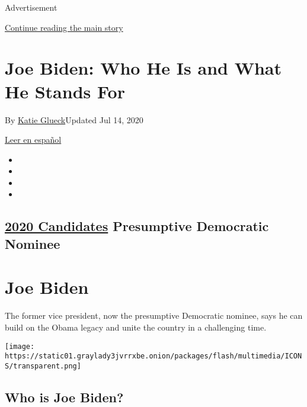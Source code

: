 Advertisement

\protect\hyperlink{after-top}{Continue reading the main story}

\hypertarget{joe-biden-who-he-is-and-what-he-stands-for}{%
\section{Joe Biden: Who He Is and What He Stands
For}\label{joe-biden-who-he-is-and-what-he-stands-for}}

By \href{https://www.nytimes3xbfgragh.onion/by/katie-glueck}{Katie
Glueck}Updated Jul 14, 2020

\href{https://www.nytimes3xbfgragh.onion/es/interactive/2020/espanol/estados-unidos/joe-biden-elecciones.html}{Leer
en español}

\begin{itemize}
\item
\item
\item
\item
\end{itemize}

\hypertarget{2020-candidates--presumptive-democratic-nominee-}{%
\subsection{\texorpdfstring{\href{https://www.nytimes3xbfgragh.onion/interactive/2019/us/politics/2020-presidential-candidates.html}{2020
Candidates} Presumptive Democratic Nominee
}{2020 Candidates  Presumptive Democratic Nominee }}\label{2020-candidates--presumptive-democratic-nominee-}}

\hypertarget{joe-biden}{%
\section{Joe Biden}\label{joe-biden}}

The former vice president, now the presumptive Democratic nominee, says
he can build on the Obama legacy and unite the country in a challenging
time.

\texttt{[image: https://static01.graylady3jvrrxbe.onion/packages/flash/multimedia/ICONS/transparent.png]}

\hypertarget{who-is-joe-biden}{%
\subsection{Who is Joe Biden?}\label{who-is-joe-biden}}

